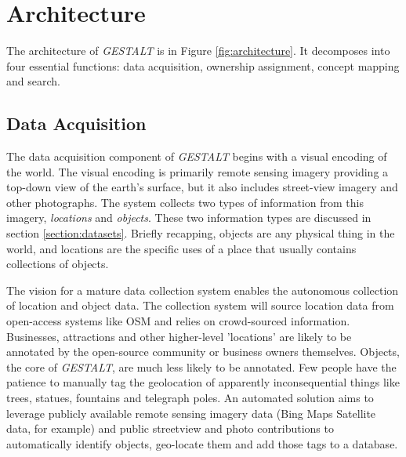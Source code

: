 \section{Architecture}
\label{section:architecture}

\begin{figure*}[t]
	\label{fig:architecture}
	
	\centering
	\caption[width=\textwidth]{The architecture of \textit{GESTALT} consists of the data collection subsystem, the ownership assignment process, the concept mapping process and the search subsystem.}
\end{figure*}

The architecture of \textit{GESTALT} is in Figure \ref{fig:architecture}. It decomposes into four essential functions: data acquisition, ownership assignment, concept mapping and search. 

\subsection{Data Acquisition}
The data acquisition component of \textit{GESTALT} begins with a visual encoding of the world. 
The visual encoding is primarily remote sensing imagery providing a top-down view of the earth's surface, but it also includes street-view imagery and other photographs. 
The system collects two types of information from this imagery, \textit{locations} and \textit{objects}. 
These two information types are discussed in section \ref{section:datasets}. 
Briefly recapping, objects are any physical thing in the world, and locations are the specific uses of a place that usually contains collections of objects. 

The vision for a mature data collection system enables the autonomous collection of location and object data. 
The collection system will source location data from open-access systems like OSM and relies on crowd-sourced information. 
Businesses, attractions and other higher-level 'locations' are likely to be annotated by the open-source community or business owners themselves. 
Objects, the core of \textit{GESTALT}, are much less likely to be annotated. Few people have the patience to manually tag the geolocation of apparently inconsequential things like trees, statues, fountains and telegraph poles. 
An automated solution aims to leverage publicly available remote sensing imagery data (Bing Maps Satellite data, for example) and public streetview and photo contributions to automatically identify objects, geo-locate them and add those tags to a database. 

